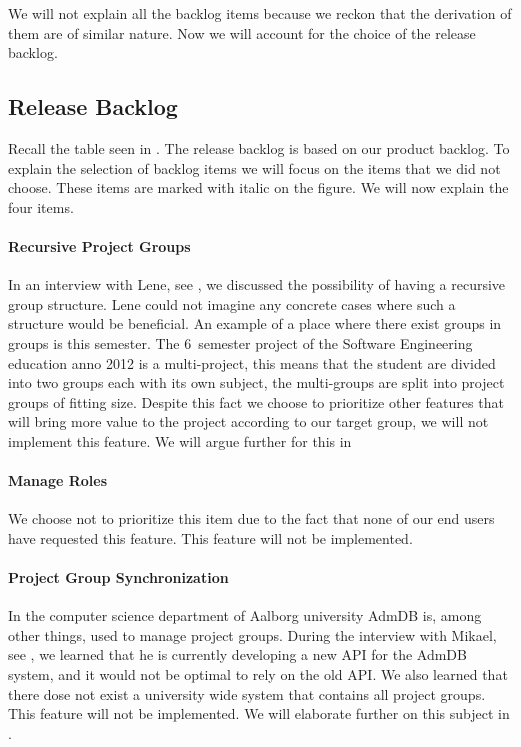 We will not explain all the backlog items because we reckon that the derivation of them are of similar nature.
Now we will account for the choice of the release backlog.

\subsection{Release Backlog}
Recall the table seen in . 
The release backlog is based on our product backlog.
To explain the selection of backlog items we will focus on the items that we did not choose.
These items are marked with italic on the figure.
We will now explain the four items.

\paragraph{Recursive Project Groups}
In an interview with Lene, see , we discussed the possibility of having a recursive group structure.
Lene could not imagine any concrete cases where such a structure would be beneficial. 
An example of a place where there exist groups in groups is this semester.
The 6\ths~semester project of the Software Engineering education anno 2012 is a multi-project, this means that the student are divided into two groups each with its own subject, the multi-groups are split into project groups of fitting size.
Despite this fact we choose to prioritize other features that will bring more value to the project according to our target group, we will not implement this feature. 
We will argue further for this in \secref{} 

\paragraph{Manage Roles}   
We choose not to prioritize this item due to the fact that none of our end users have requested this feature. 
This feature will not be implemented. 

\paragraph{Project Group Synchronization}
In the computer science department of Aalborg university AdmDB is, among other things, used to manage project groups. 
During the interview with Mikael, see , we learned that he is currently developing a new API for the AdmDB system, and it would not be optimal to rely on the old API. 
We also learned that there dose not exist a university wide system that contains all project groups. 
This feature will not be implemented. 
We will elaborate further on this subject in . 

